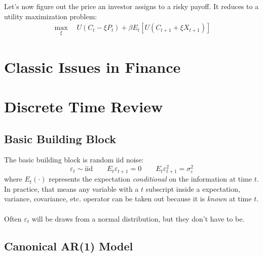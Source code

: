 \documentclass[a4paper,12pt]{scrartcl}
\begin{document}
Let's now figure out the price an investor assigns to a risky
payoff.  It reduces to a utility maximization problem:
\begin{align*}
    \max_{\xi} \quad U(C_t - \xi P_t) + \beta E_t\left[U(C_{t+1} + \xi X_{t+1})\right]
\end{align*}


\newpage
\section{Classic Issues in Finance}




\newpage
\appendix


\section{Discrete Time Review}

\subsection{Basic Building Block}

The basic building block is random iid noise:
    \[ \varepsilon_t \sim \text{iid} \qquad
	E_t\varepsilon_{t+1} = 0 \qquad 
	E_t\varepsilon^2_{t+1} = \sigma_\varepsilon^2
    \]
where $E_t(\cdot)$ represents the expectation \emph{conditional} on
the information at time $t$. In practice, that means any variable
with a $t$ subscript inside a expectation, variance, covariance, etc.
operator can be taken out because it is \emph{known} at time $t$.
\\
\\
Often $\varepsilon_t$ will be draws
from a normal distribution, but they don't have to be.

\subsection{Canonical AR(1) Model}
\end{document}

